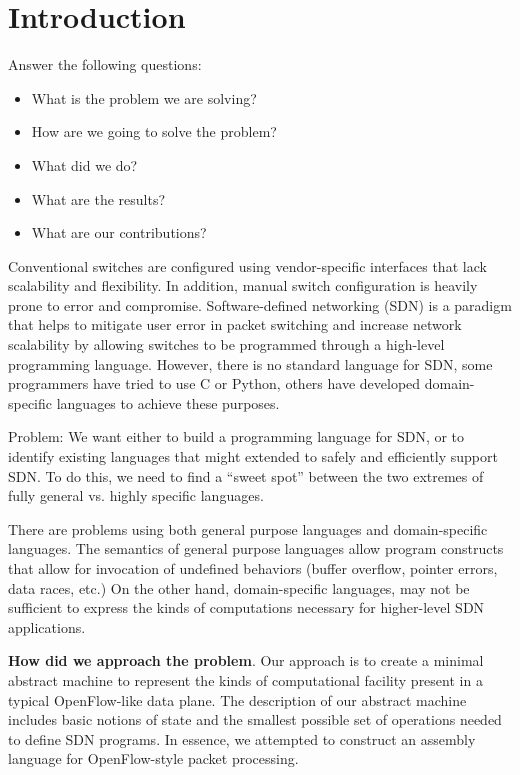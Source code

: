 
\section{Introduction}

Answer the following questions:
\begin{itemize}
\item What is the problem we are solving?
\item How are we going to solve the problem?
\item What did we do?
\item What are the results?
\item What are our contributions?
\end{itemize}

Conventional switches are configured using vendor-specific interfaces that lack scalability and flexibility. In addition, manual switch configuration is heavily prone to error and compromise. Software-defined networking (SDN) is a paradigm that helps to mitigate user error in packet switching and increase network scalability by allowing switches to be programmed through a high-level programming language. However, there is no standard language for SDN, some programmers have tried to use C or Python, others have developed domain-specific languages to achieve these purposes.

Problem: We want either to build a programming language for SDN, or to identify existing languages that might extended to safely and efficiently support SDN.
To do this, we need to find a ``sweet spot'' between the two extremes of fully general vs. highly specific languages.

There are problems using both general purpose languages and domain-specific
languages. 
The semantics of general purpose languages allow program constructs that
allow for invocation of undefined behaviors (buffer overflow, pointer errors, 
data races, etc.) 
On the other hand, domain-specific languages, may not be sufficient to express the kinds of computations necessary for higher-level SDN applications.

\textbf{How did we approach the problem}.
Our approach is to create a minimal abstract machine to represent the kinds of computational facility present in a typical OpenFlow-like data plane.
The description of our abstract machine includes basic notions of state and the smallest possible set of operations needed to define SDN programs.
In essence, we attempted to construct an assembly language for OpenFlow-style packet processing.


